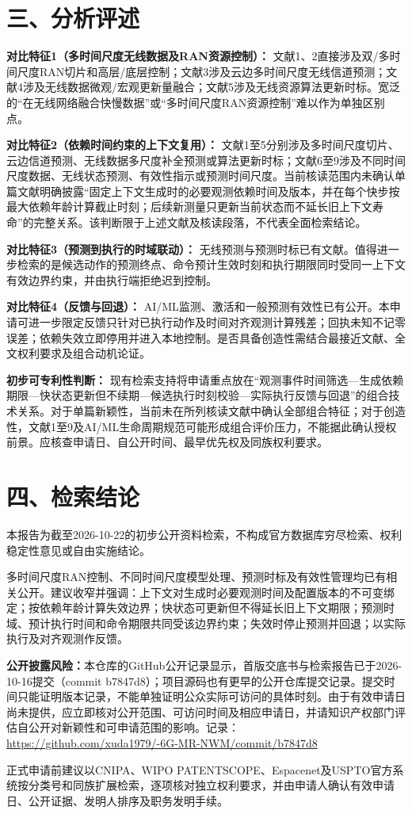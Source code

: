 \documentclass[12pt,a4paper]{article}
\begin{document}
\section*{三、分析评述}

\textbf{对比特征1（多时间尺度无线数据及RAN资源控制）：}
文献1、2直接涉及双/多时间尺度RAN切片和高层/底层控制；文献3涉及云边多时间尺度无线信道预测；文献4涉及无线数据微观/宏观更新量融合；文献5涉及无线资源算法更新时标。宽泛的“在无线网络融合快慢数据”或“多时间尺度RAN资源控制”难以作为单独区别点。

\textbf{对比特征2（依赖时间约束的上下文复用）：}
文献1至5分别涉及多时间尺度切片、云边信道预测、无线数据多尺度补全预测或算法更新时标；文献6至9涉及不同时间尺度数据、无线状态预测、有效性指示或预测时间尺度。当前核读范围内未确认单篇文献明确披露“固定上下文生成时的必要观测依赖时间及版本，并在每个快步按最大依赖年龄计算截止时刻；后续新测量只更新当前状态而不延长旧上下文寿命”的完整关系。该判断限于上述文献及核读段落，不代表全面检索结论。

\textbf{对比特征3（预测到执行的时域联动）：}
无线预测与预测时标已有文献。值得进一步检索的是候选动作的预测终点、命令预计生效时刻和执行期限同时受同一上下文有效边界约束，并由执行端拒绝迟到控制。

\textbf{对比特征4（反馈与回退）：}
AI/ML监测、激活和一般预测有效性已有公开。本申请可进一步限定反馈只针对已执行动作及时间对齐观测计算残差；回执未知不记零误差；依赖失效立即停用并进入本地控制。是否具备创造性需结合最接近文献、全文权利要求及组合动机论证。

\textbf{初步可专利性判断：}
现有检索支持将申请重点放在“观测事件时间筛选—生成依赖期限—快状态更新但不续期—候选执行时刻校验—实际执行反馈与回退”的组合技术关系。对于单篇新颖性，当前未在所列核读文献中确认全部组合特征；对于创造性，文献1至9及AI/ML生命周期规范可能形成组合评价压力，不能据此确认授权前景。应核查申请日、自公开时间、最早优先权及同族权利要求。

\section*{四、检索结论}

本报告为截至2026-10-22的初步公开资料检索，不构成官方数据库穷尽检索、权利稳定性意见或自由实施结论。

多时间尺度RAN控制、不同时间尺度模型处理、预测时标及有效性管理均已有相关公开。建议收窄并强调：上下文对生成时必要观测时间及配置版本的不可变绑定；按依赖年龄计算失效边界；快状态可更新但不得延长旧上下文期限；预测时域、预计执行时间和命令期限共同受该边界约束；失效时停止预测并回退；以实际执行及对齐观测作反馈。

\textbf{公开披露风险：}本仓库的GitHub公开记录显示，首版交底书与检索报告已于2026-10-16提交（commit b7847d8）；项目源码也有更早的公开仓库提交记录。提交时间只能证明版本记录，不能单独证明公众实际可访问的具体时刻。由于有效申请日尚未提供，应立即核对公开范围、可访问时间及相应申请日，并请知识产权部门评估自公开对新颖性和可申请范围的影响。记录：\url{https://github.com/xuda1979/-6G-MR-NWM/commit/b7847d8}

正式申请前建议以CNIPA、WIPO PATENTSCOPE、Espacenet及USPTO官方系统按分类号和同族扩展检索，逐项核对独立权利要求，并由申请人确认有效申请日、公开证据、发明人排序及职务发明手续。
\end{document}
